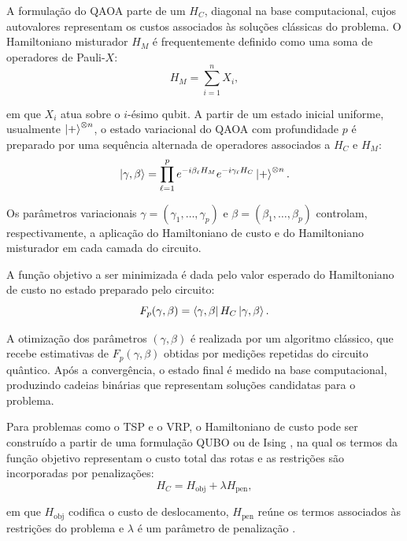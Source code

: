 A formulação do QAOA parte de um $H_C$, diagonal na base computacional, cujos autovalores representam os custos associados às soluções clássicas do problema. O Hamiltoniano misturador $H_M$ é frequentemente definido como uma soma de operadores de Pauli-$X$:
\begin{equation}
    H_M = \sum_{i=1}^{n} X_i,
\end{equation}

\noindent em que $X_i$ atua sobre o $i$-ésimo qubit. A partir de um estado inicial uniforme, usualmente $\ket{+}^{\otimes n}$, o estado variacional do QAOA com profundidade $p$ é preparado por uma sequência alternada de operadores associados a $H_C$ e $H_M$:
\begin{equation}
    \ket{\gamma,\beta}
    =
    \prod_{\ell=1}^{p}
    e^{-i\beta_{\ell}H_M}
    e^{-i\gamma_{\ell}H_C}
    \ket{+}^{\otimes n}.
\end{equation}

Os parâmetros variacionais $\gamma=(\gamma_1,\ldots,\gamma_p)$ e $\beta=(\beta_1,\ldots,\beta_p)$ controlam, respectivamente, a aplicação do Hamiltoniano de custo e do Hamiltoniano misturador em cada camada do circuito.

A função objetivo a ser minimizada é dada pelo valor esperado do Hamiltoniano de custo no estado preparado pelo circuito:
\begin{equation}
    F_p(\gamma,\beta)
    =
    \bra{\gamma,\beta}
    H_C
    \ket{\gamma,\beta}.
\end{equation}

A otimização dos parâmetros $(\gamma,\beta)$ é realizada por um algoritmo clássico, que recebe estimativas de $F_p(\gamma,\beta)$ obtidas por medições repetidas do circuito quântico. Após a convergência, o estado final é medido na base computacional, produzindo cadeias binárias que representam soluções candidatas para o problema.

Para problemas como o TSP e o VRP, o Hamiltoniano de custo pode ser construído a partir de uma formulação QUBO ou de Ising \cite{lucas2014ising}, na qual os termos da função objetivo representam o custo total das rotas e as restrições são incorporadas por penalizações:
\begin{equation}
    H_C = H_{\mathrm{obj}} + \lambda H_{\mathrm{pen}},
\end{equation}

\noindent em que $H_{\mathrm{obj}}$ codifica o custo de deslocamento, $H_{\mathrm{pen}}$ reúne os termos associados às restrições do problema e $\lambda$ é um parâmetro de penalização \cite{irie2019quantum}.

